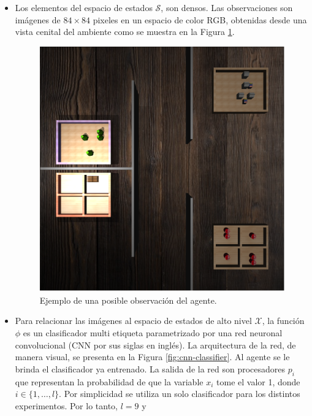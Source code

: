\begin{itemize}
    \item Los elementos del espacio de estados $\mathcal{S}$, son densos.
    Las observaciones son imágenes de $84\times 84$ pixeles en un espacio de color RGB, obtenidas desde una vista cenital del ambiente como se muestra en la Figura \ref{fig:obs-example-lights}.
    
    \begin{figure}[H]
        \centering
        \includegraphics[scale=0.2]{Chapter5/Figs/obs_example.png}
        \caption{Ejemplo de una posible observación del agente.}
        \label{fig:obs-example-lights}
    \end{figure}
    \item Para relacionar las imágenes al espacio de estados de alto nivel $\mathcal{X}$, la función $\phi$ es un clasificador multi etiqueta
    parametrizado por una red neuronal convolucional \cite{Goodfellow-et-al-2016} (CNN por sus siglas en inglés). La arquitectura de la red, de manera visual, se presenta en la Figura \ref{fig:cnn-classifier}. Al agente se le brinda el clasificador ya entrenado.
    La salida de la red son procesadores $p_i$ que
    representan la probabilidad de que la variable $x_i$ tome el valor 1, donde
    $i \in \{1, \dots, l\}$. Por simplicidad se utiliza un solo
    clasificador para los distintos experimentos. Por lo tanto, $l = 9$ y

\end{itemize}
